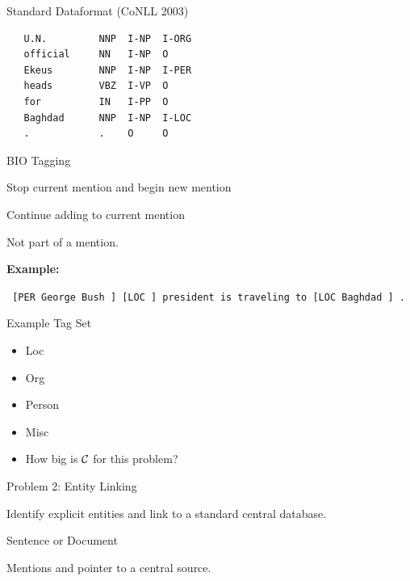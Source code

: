 \documentclass{beamer}
\begin{document}
\begin{frame}[fragile]{Standard Dataformat (CoNLL 2003)}
  \begin{center}
    

\begin{verbatim}
   U.N.         NNP  I-NP  I-ORG 
   official     NN   I-NP  O 
   Ekeus        NNP  I-NP  I-PER 
   heads        VBZ  I-VP  O 
   for          IN   I-PP  O 
   Baghdad      NNP  I-NP  I-LOC 
   .            .    O     O 
\end{verbatim}
  \end{center}
\end{frame}

\begin{frame}{BIO Tagging}
  \begin{description} \itemsep 20pt
  \item[B-TYPE] Stop current mention and begin new mention
    \air 
  \item[I-TYPE] Continue adding to current mention
  \item[O ] Not part of a mention.
  \end{description}
  \pause
  
  \textbf{Example:} 

  \texttt{ [PER \alert{George Bush} ]  [LOC  ] president is traveling to [LOC \alert{Baghdad} ] .  } 
\end{frame}

\begin{frame}{Example Tag Set}
  \begin{itemize}
  \item Loc
  \item Org
  \item Person
  \item Misc 
  \end{itemize}
  \air 
  
  \begin{itemize}
  \item How big is $\mathcal{C}$ for this problem?
  \end{itemize}
\end{frame}

\begin{frame}{Problem 2: Entity Linking}
  \begin{description} \itemsep 20pt
  \item[Goal] Identify explicit entities and link to a standard
  central database.
  \item[Input] Sentence or Document
  \item[Output] Mentions and pointer to a central source.
  \end{description}  

\end{frame}
\end{document}
